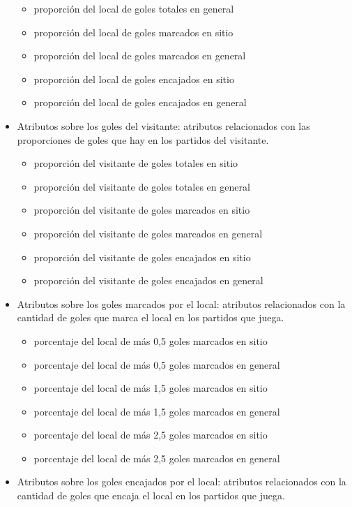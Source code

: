 \begin{itemize}
\begin{itemize}
        \item proporción del local de goles totales en general
        \item proporción del local de goles marcados en sitio
        \item proporción del local de goles marcados en general
        \item proporción del local de goles encajados en sitio
        \item proporción del local de goles encajados en general
    \end{itemize}
    \item Atributos sobre los goles del visitante: atributos relacionados con las proporciones de goles que hay en los partidos del visitante.
    \begin{itemize}
        \item proporción del visitante de goles totales en sitio
        \item proporción del visitante de goles totales en general
        \item proporción del visitante de goles marcados en sitio
        \item proporción del visitante de goles marcados en general
        \item proporción del visitante de goles encajados en sitio
        \item proporción del visitante de goles encajados en general
    \end{itemize}
    \item Atributos sobre los goles marcados por el local: atributos relacionados con la cantidad de goles que marca el local en los partidos que juega.
    \begin{itemize}
        \item porcentaje del local de más 0,5 goles marcados en sitio
        \item porcentaje del local de más 0,5 goles marcados en general
        \item porcentaje del local de más 1,5 goles marcados en sitio
        \item porcentaje del local de más 1,5 goles marcados en general
        \item porcentaje del local de más 2,5 goles marcados en sitio
        \item porcentaje del local de más 2,5 goles marcados en general
    \end{itemize}
    \item Atributos sobre los goles encajados por el local: atributos relacionados con la cantidad de goles que encaja el local en los partidos que juega.

\end{itemize}
